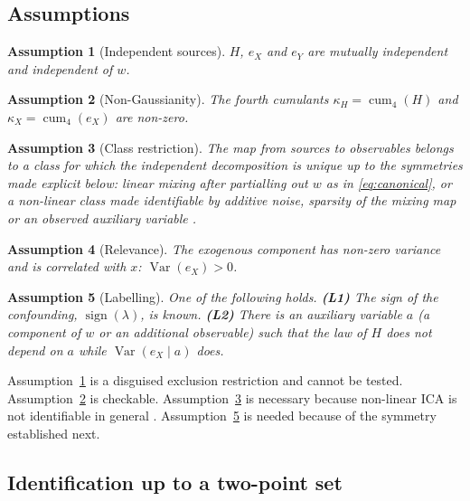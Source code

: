 \documentclass[11pt]{article}
\newtheorem{assumption}{Assumption}
\theoremstyle{definition}
\theoremstyle{remark}
\newcommand{\Var}{\operatorname{Var}}
\newcommand{\cum}{\operatorname{cum}}
\begin{document}
\subsection{Assumptions}

\begin{assumption}[Independent sources]\label{ass:indep}
$H$, $e_X$ and $e_Y$ are mutually independent and independent of $w$.
\end{assumption}

\begin{assumption}[Non-Gaussianity]\label{ass:nongauss}
The fourth cumulants $\kappa_H = \cum_4(H)$ and $\kappa_X = \cum_4(e_X)$ are non-zero.
\end{assumption}

\begin{assumption}[Class restriction]\label{ass:class}
The map from sources to observables belongs to a class for which the independent decomposition is
unique up to the symmetries made explicit below: linear mixing after partialling out $w$ as in
\eqref{eq:canonical}, or a non-linear class made identifiable by additive noise, sparsity of the
mixing map or an observed auxiliary variable
\citep{hyvarinen2019,khemakhem2020,zheng2022}.
\end{assumption}

\begin{assumption}[Relevance]\label{ass:relevance}
The exogenous component has non-zero variance and is correlated with $x$: $\Var(e_X)>0$.
\end{assumption}

\begin{assumption}[Labelling]\label{ass:label}
One of the following holds.
\textbf{(L1)} The sign of the confounding, $\operatorname{sign}(\lambda)$, is known.
\textbf{(L2)} There is an auxiliary variable $a$ (a component of $w$ or an additional observable)
such that the law of $H$ does not depend on $a$ while $\Var(e_X\mid a)$ does.
\end{assumption}

Assumption~\ref{ass:indep} is a disguised exclusion restriction and cannot be tested.
Assumption~\ref{ass:nongauss} is checkable. Assumption~\ref{ass:class} is necessary because
non-linear ICA is not identifiable in general \citep{hyvarinen1999}. Assumption~\ref{ass:label} is
needed because of the symmetry established next.

\subsection{Identification up to a two-point set}
\end{document}
